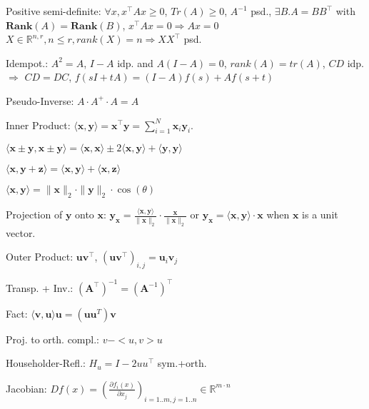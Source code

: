 \begin{compactdesc}
	\item[Positive semi-definite:] $\forall x, x^\top A x \geq 0$, $Tr(A)\geq 0$, $A^{-1}$ psd., $\exists B . A=BB^\top$ with $\mathbf{Rank}(A)=\mathbf{Rank}(B)$, $x^\top A x = 0 \Rightarrow A x = 0$ $X\in \mathbb{R}^{n,r}, n\leq r, rank(X)=n \Rightarrow XX^\top$ psd.
	\item[Idempot.:] $A^2 = A$, $I-A$ idp. and $A(I-A)=0$, $rank(A)=tr(A)$, $CD$ idp. $\Rightarrow$ $CD=DC$, $f(sI+tA)=(I-A)f(s)+A f(s+t)$
	\item[Pseudo-Inverse:] $A\cdot A^+\cdot A = A$
	\item[Inner Product:] $\langle \mathbf{x}, \mathbf{y} \rangle = \mathbf{x}^\top \mathbf{y} = \sum_{i=1}^{N} \mathbf{x}_i \mathbf{y}_i$.
	\begin{inparaitem}
		\item $\langle \mathbf{x} \pm \mathbf{y}, \mathbf{x} \pm \mathbf{y} \rangle = \langle \mathbf{x}, \mathbf{x} \rangle \pm 2 \langle \mathbf{x}, \mathbf{y} \rangle + \langle \mathbf{y}, \mathbf{y} \rangle$
		\item $\langle \mathbf{x}, \mathbf{y} + \mathbf{z} \rangle = \langle \mathbf{x}, \mathbf{y} \rangle + \langle \mathbf{x}, \mathbf{z} \rangle$
		\item $\langle \mathbf{x}, \mathbf{y} \rangle = \|\mathbf{x}\|_2 \cdot \|\mathbf{y}\|_2 \cdot \cos(\theta)$
		\item Projection of $\mathbf{y}$ onto $\mathbf{x}$: $\mathbf{y_x}= \frac{\langle \mathbf{x}, \mathbf{y} \rangle}{\|\mathbf{x}\|_2} \cdot \frac{\mathbf{x}}{\|\mathbf{x}\|_2}$ or $\mathbf{y_x}= \langle \mathbf{x}, \mathbf{y} \rangle \cdot \mathbf{x}$ when $\mathbf{x}$ is a unit vector.
	\end{inparaitem}
	\item[Outer Product:] $\mathbf{u} \mathbf{v}^\top$, $(\mathbf{u} \mathbf{v}^\top)_{i, j} = \mathbf{u}_i \mathbf{v}_j$
	\item[Transp. + Inv.:] $(\mathbf{A}^\top)^{-1} = (\mathbf{A}^{-1})^\top$
	\item[Fact:] $\langle \mathbf{v} , \mathbf{u} \rangle \mathbf{u} = (\mathbf{uu}^T)\mathbf{v}$
	\item[Proj. to orth. compl.:] $v-<u,v>u$
	\item[Householder-Refl.:] $H_u=I-2uu^\top$ sym.+orth.
	\item[Jacobian:] $D f(x)=(\frac{\partial f_i(x)}{\partial x_j})_{i=1..m, j=1..n} \in \mathbb{R}^{m\cdot n}$
\end{compactdesc}


